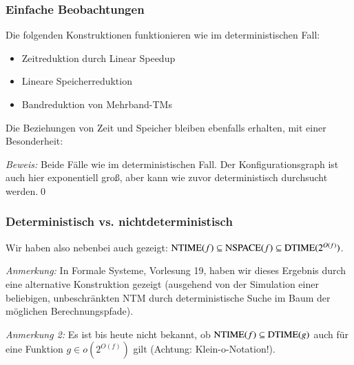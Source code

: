 \documentclass[aspectratio=1610,onlymath]{beamer}
\begin{document}
\begin{frame}\frametitle{Einfache Beobachtungen}


Die folgenden Konstruktionen funktionieren wie im deterministischen Fall:
\begin{itemize}
\item Zeitreduktion durch Linear Speedup
\item Lineare Speicherreduktion
\item Bandreduktion von Mehrband-TMs
\end{itemize}\pause

Die Beziehungen von Zeit und Speicher bleiben ebenfalls erhalten, mit einer Besonderheit:
\medskip


\pause\emph{Beweis:} Beide Fälle wie im deterministischen Fall.
Der Konfigurationsgraph ist auch hier
exponentiell groß, aber kann wie zuvor deterministisch durchsucht werden.\qed

\end{frame}

\begin{frame}\frametitle{Deterministisch vs. nichtdeterministisch}

Wir haben also nebenbei auch gezeigt: ${\textsc{NTIME}}(f) \subseteq {\textsc{NSPACE}}(f)\subseteq {\textsc{DTIME}}(2^{O(f)})$.\bigskip


\emph{Anmerkung:} In Formale Systeme, Vorlesung 19, haben wir dieses Ergebnis durch eine alternative Konstruktion gezeigt (ausgehend von der Simulation einer beliebigen, unbeschränkten NTM durch deterministische Suche im Baum der möglichen Berechnungspfade).
\bigskip

\emph{Anmerkung 2:} Es ist bis heute nicht bekannt, ob ${\textsc{NTIME}}(f) \subseteq {\textsc{DTIME}}(g)$ auch für eine Funktion $g\in o(2^{O(f)})$ gilt
(Achtung: Klein-o-Notation!).
%

\end{frame}
\end{document}
